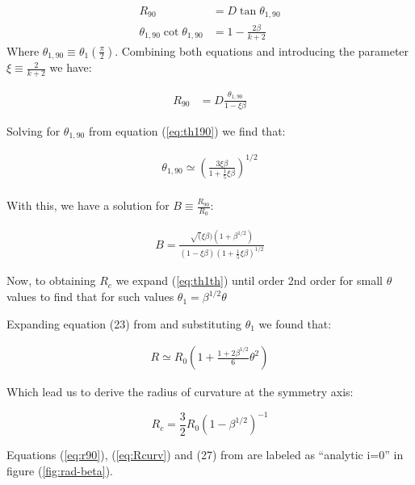\begin{align}
R_{90} &= D\tan\theta_{1,90} \\
\theta_{1,90}\cot\theta_{1,90} &= 1-\frac{2\beta}{k+2} \label{eq:th190}
\end{align}
Where $\theta_{1,90}\equiv \theta_1(\frac{\pi}{2})$. Combining both equations and  introducing the parameter 
$\xi\equiv \frac{2}{k+2}$ we have:

\begin{align}
R_{90} &= D\frac{\theta_{1,90}}{1-\xi\beta} 
\end{align}


Solving for $\theta_{1,90}$ from equation (\ref{eq:th190}) we find that:

\begin{align}
\theta_{1,90} \simeq \left(\frac{3\xi\beta}{1+\frac{1}{5}\xi\beta}\right)^{1/2} \\
\label{eq:th190sol}
\end{align}

With this, we have a solution for $B \equiv \frac{R_{90}}{R_0}$:

\begin{align}
B = \frac{\sqrt(\xi\beta)\left(1+\beta^{1/2}\right)}{(1-\xi\beta)\left(1+\frac{1}{5}\xi\beta\right)^{1/2}}
\label{eq:B}
\end{align}

Now, to obtaining $R_c$ we expand  (\ref{eq:th1th}) until order 2nd order for small $\theta$ values to find that for such values
$\theta_1 = \beta^{1/2}\theta$

Expanding equation (23) from \citep{Canto:1996} and substituting $\theta_1$ we found that:

\begin{align}
R \simeq R_0 \left(1+\frac{1+2\beta^{1/2}}{6}\theta^2\right)
\label{eq:R_approx}
\end{align}

Which lead us to derive the radius of curvature at the symmetry axis:

\begin{equation}
R_c = \frac{3}{2}R_0\left(1-\beta^{1/2}\right)^{-1}
\label{eq:Rcurv}
\end{equation}

Equations (\ref{eq:r90}),  (\ref{eq:Rcurv}) and (27) from \citep{Canto:1996} are labeled as ``analytic i=0'' in figure (\ref{fig:rad-beta}).

